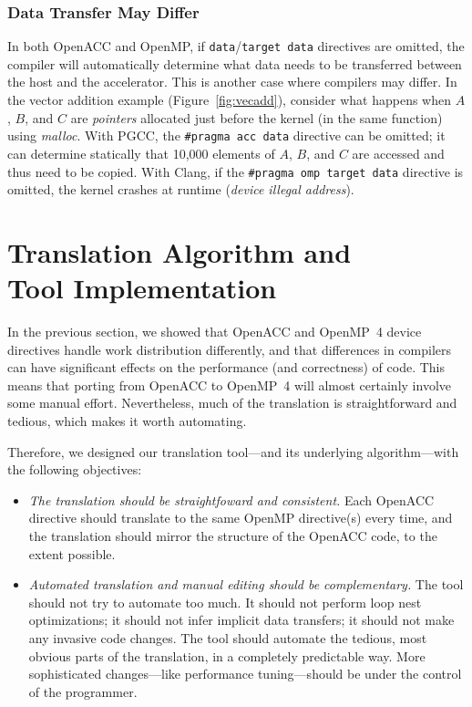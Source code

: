 \documentclass{sig-alternate-05-2015}
\begin{document}


\subsubsection{Data Transfer May Differ}

In both OpenACC and OpenMP, if \texttt{data}/\texttt{target data} directives
are omitted, the compiler will automatically determine what data needs to be
transferred between the host and the accelerator.  This is another case where
compilers may differ.  In the vector addition example
(Figure~\ref{fig:vecadd}), consider what happens when $A$, $B$, and $C$ are
\emph{pointers} allocated just before the kernel (in the same function) using
\textit{malloc}.  With PGCC, the \texttt{\#pragma acc data} directive can be
omitted; it can determine statically that 10,000 elements of $A$, $B$, and
$C$ are accessed and thus need to be copied.  With Clang, if the
\texttt{\#pragma omp target data} directive is omitted, the kernel crashes at
runtime (\emph{device illegal address}).

\section{Translation Algorithm and \\ Tool Implementation}
\label{sec:algorithm}

In the previous section, we showed that OpenACC and OpenMP~4 device directives
handle work distribution differently, and that differences in compilers can
have significant effects on the performance (and correctness) of code.  This
means that porting from OpenACC to OpenMP~4 will almost certainly involve some
manual effort.  Nevertheless, much of the translation is straightforward and
tedious, which makes it worth automating.

Therefore, we designed our translation tool---and its underlying
algorithm---with the following objectives:
\begin{itemize}
\item \emph{The translation should be straightfoward and consistent.}
Each OpenACC directive should translate to the same OpenMP directive(s)
every time, and the translation should mirror the structure of the OpenACC
code, to the extent possible.
\item \emph{Automated translation and manual editing should be complementary.}
The tool should not try to automate too much.  It should not perform loop
nest optimizations; it should not infer implicit data transfers; it should
not make any invasive code changes.  The tool should automate the tedious,
most obvious parts of the translation, in a completely predictable way.
More sophisticated changes---like performance tuning---should be under the
control of the programmer.
\end{itemize}
\end{document}
